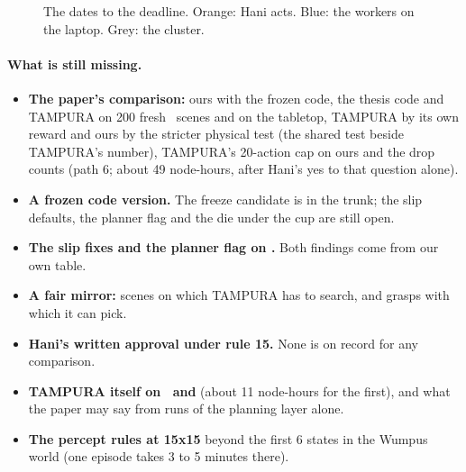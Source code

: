 \begin{figure}[H]
\centering
{}
\caption{The dates to the deadline. Orange: Hani acts. Blue: the workers on the laptop. Grey: the cluster.}
\label{fig:dates}
\end{figure}

\paragraph{What is still missing.}
\begin{itemize}
\item \textbf{The paper's comparison:} ours with the frozen code, the thesis code and TAMPURA on 200 fresh
\fdice\ scenes and on the tabletop, TAMPURA by its own reward and ours by the stricter physical test (the shared
test beside TAMPURA's number), TAMPURA's 20-action cap on ours and the drop
counts (path 6; about 49 node-hours, after Hani's yes to that question alone).
\item \textbf{A frozen code version.} The freeze candidate is in the trunk; the slip defaults, the planner flag
and the die under the cup are still open.
\item \textbf{The slip fixes and the planner flag on \fdice.} Both findings come from our own table.
\item \textbf{A fair mirror:} scenes on which TAMPURA has to search, and grasps with which it can pick.
\item \textbf{Hani's written approval under rule 15.} None is on record for any comparison.
\item \textbf{TAMPURA itself on \cuncert\ and \slamcol} (about 11 node-hours for the first), and what the paper
may say from runs of the planning layer alone.
\item \textbf{The percept rules at 15x15} beyond the first 6 states in the Wumpus world (one episode takes 3
to 5 minutes there).
\end{itemize}

